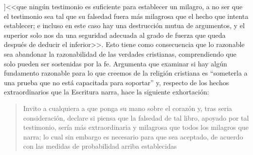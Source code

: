 ]{<<que ningún testimonio es suficiente para establecer un milagro, a no ser que el testimonio sea tal que su falsedad fuera más milagrosa que el hecho que intenta establecer; e incluso en este caso hay una destrucción mutua de argumentos, y el superior solo nos da una seguridad adecuada al grado de fuerza que queda después de deducir el inferior>>}.
\label{subsec:humarg}
Esto tiene como consecuencia que lo razonable sea abandonar la razonabilidad de las verdades cristianas, comprendiendo que solo pueden ser sostenidas por la fe. Argumenta que examinar si hay algún fundamento razonable para lo que creemos de la religión cristiana es \enquote{someterla a una prueba que no está capacitada para soportar} y, respecto de los hechos extraordinarios que la Escritura narra, hace la siguiente exhortación: \blockquote[{\cite[\S10,2. 157-158]{hume1777enquiryes}}]{Invito a cualquiera a que ponga su mano sobre el corazón y, tras seria consideración, declare si piensa que la falsedad de tal libro, apoyado por tal testimonio, sería más extraordinaria y milagrosa que todos los milagros que narra; lo cual sin embargo es necesario para que sea aceptado, de acuerdo con las medidas de probabilidad arriba establecidas}.
